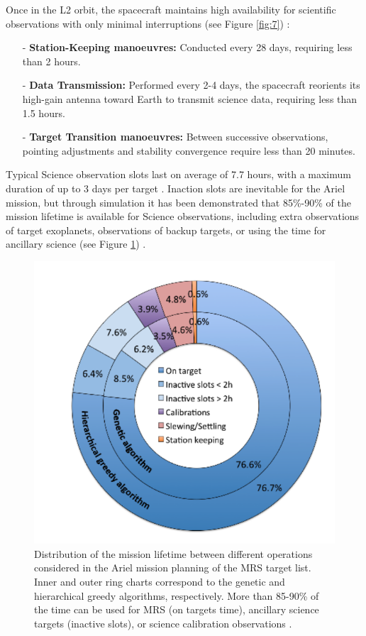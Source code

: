 \documentclass[12pt]{article}
\begin{document}
Once in the L2 orbit, the spacecraft maintains high availability for scientific observations with only minimal interruptions (see Figure \ref{fig:7}) \cite{salvignol2024ariel}:

\begin{itemize}
    \item[-] \textbf{Station-Keeping manoeuvres:} Conducted every 28 days, requiring less than 2 hours.
    \item[-] \textbf{Data Transmission:} Performed every 2-4 days, the spacecraft reorients its high-gain antenna toward Earth to transmit science data, requiring less than 1.5 hours.
    \item[-] \textbf{Target Transition manoeuvres:} Between successive observations, pointing adjustments and stability convergence require less than 20 minutes.
\end{itemize}

Typical Science observation slots last on average of 7.7 hours, with a maximum duration of up to 3 days per target \cite{salvignol2024ariel}.
Inaction slots are inevitable for the Ariel mission, but through simulation it has been demonstrated that 85\%-90\% of the mission lifetime is available for Science observations, including extra observations of target exoplanets, observations of backup targets,
or using the time for ancillary science (see Figure \ref{fig:8}) \cite{arielstudyreport}.

\begin{figure}
    \centering
    \includegraphics[width=.6\textwidth]{distribution ariel.png}
    \caption{Distribution of the mission lifetime between different operations considered in the Ariel mission planning of the MRS target list. Inner and outer ring charts correspond to the genetic and hierarchical greedy algorithms, respectively. More than
    85-90\% of the time can be used for MRS (on targets time), ancillary science targets (inactive slots), or science calibration observations \protect\cite{arielstudyreport}.}
    \label{fig:8}
\end{figure}
\end{document}
